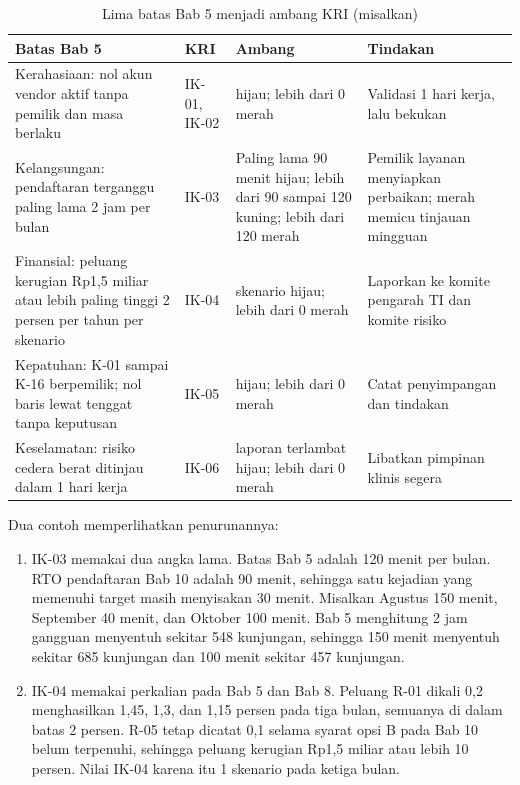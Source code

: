 \begin{table}[!htb]
  \centering\small
  \caption{Lima batas Bab 5 menjadi ambang KRI (misalkan)}\label{tab:ch13-ambang}
  \begin{tabularx}{\textwidth}{|>{\raggedright\arraybackslash}X|>{\raggedright\arraybackslash}p{}|>{\raggedright\arraybackslash}p{}|>{\raggedright\arraybackslash}p{}|}
    \hline
    \textbf{Batas Bab 5} & \textbf{KRI} & \textbf{Ambang} & \textbf{Tindakan} \\ \hline
    Kerahasiaan: nol akun vendor aktif tanpa pemilik dan masa berlaku & IK-01, IK-02 & 0 hijau;
    lebih dari 0 merah & Validasi 1 hari kerja, lalu bekukan \\ \hline
    Kelangsungan: pendaftaran terganggu paling lama 2 jam per bulan & IK-03 & Paling lama 90 menit
    hijau; lebih dari 90 sampai 120 kuning; lebih dari 120 merah & Pemilik layanan menyiapkan
    perbaikan; merah memicu tinjauan mingguan \\ \hline
    Finansial: peluang kerugian Rp1,5 miliar atau lebih paling tinggi 2 persen per tahun per
    skenario & IK-04 & 0 skenario hijau; lebih dari 0 merah & Laporkan ke komite pengarah TI dan
    komite risiko \\ \hline
    Kepatuhan: K-01 sampai K-16 berpemilik; nol baris lewat tenggat tanpa keputusan & IK-05 & 0
    hijau; lebih dari 0 merah & Catat penyimpangan dan tindakan \\ \hline
    Keselamatan: risiko cedera berat ditinjau dalam 1 hari kerja & IK-06 & 0 laporan terlambat
    hijau; lebih dari 0 merah & Libatkan pimpinan klinis segera \\ \hline
  \end{tabularx}
\end{table}

Dua contoh memperlihatkan penurunannya:
\begin{enumerate}
  \item IK-03 memakai dua angka lama. Batas Bab 5 adalah 120 menit per bulan. RTO pendaftaran Bab
  10 adalah 90 menit, sehingga satu kejadian yang memenuhi target masih menyisakan 30 menit.
  Misalkan Agustus 150 menit, September 40 menit, dan Oktober 100 menit. Bab 5 menghitung 2 jam
  gangguan menyentuh sekitar 548 kunjungan, sehingga 150 menit menyentuh sekitar 685 kunjungan dan
  100 menit sekitar 457 kunjungan.
  \item IK-04 memakai perkalian pada Bab 5 dan Bab 8. Peluang R-01 dikali 0,2 menghasilkan 1,45,
  1,3, dan 1,15 persen pada tiga bulan, semuanya di dalam batas 2 persen. R-05 tetap dicatat 0,1
  selama syarat opsi B pada Bab 10 belum terpenuhi, sehingga peluang kerugian Rp1,5 miliar atau
  lebih 10 persen. Nilai IK-04 karena itu 1 skenario pada ketiga bulan.
\end{enumerate}

